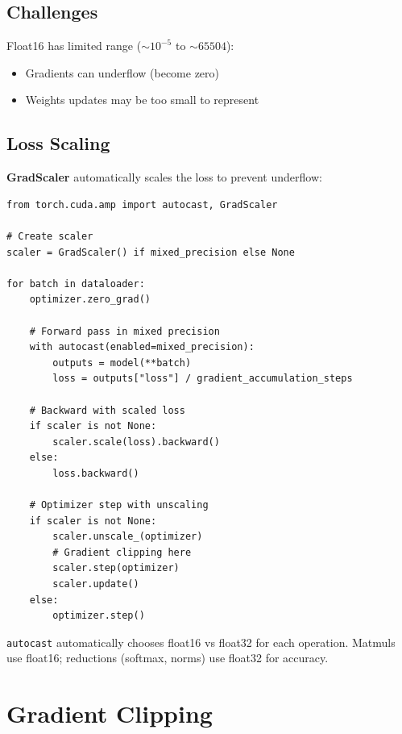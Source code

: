 \subsection{Challenges}

Float16 has limited range ($\sim 10^{-5}$ to $\sim 65504$):
\begin{itemize}
    \item Gradients can underflow (become zero)
    \item Weights updates may be too small to represent
\end{itemize}

\subsection{Loss Scaling}

\textbf{GradScaler} automatically scales the loss to prevent underflow:

\begin{lstlisting}[style=python, caption={Mixed precision training from trainer.py}]
from torch.cuda.amp import autocast, GradScaler

# Create scaler
scaler = GradScaler() if mixed_precision else None

for batch in dataloader:
    optimizer.zero_grad()

    # Forward pass in mixed precision
    with autocast(enabled=mixed_precision):
        outputs = model(**batch)
        loss = outputs["loss"] / gradient_accumulation_steps

    # Backward with scaled loss
    if scaler is not None:
        scaler.scale(loss).backward()
    else:
        loss.backward()

    # Optimizer step with unscaling
    if scaler is not None:
        scaler.unscale_(optimizer)
        # Gradient clipping here
        scaler.step(optimizer)
        scaler.update()
    else:
        optimizer.step()
\end{lstlisting}

\begin{keypoint}
\texttt{autocast} automatically chooses float16 vs float32 for each operation. Matmuls use float16; reductions (softmax, norms) use float32 for accuracy.
\end{keypoint}

\section{Gradient Clipping}

